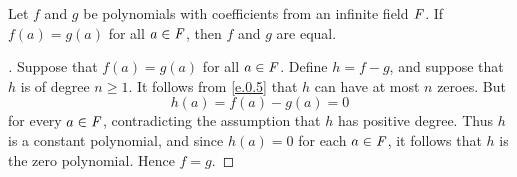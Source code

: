 \begin{thm}\label{e.10}
	Let \(f\) and \(g\) be polynomials with coefficients from an infinite field \(\mathit{F}\).
	If \(f(a) = g(a)\) for all \(a \in \mathit{F}\), then \(f\) and \(g\) are equal.
\end{thm}

\begin{proof}[]
	Suppose that \(f(a) = g(a)\) for all \(a \in \mathit{F}\).
	Define \(h = f - g\), and suppose that \(h\) is of degree \(n \geq 1\).
	It follows from \cref{e.0.5} that \(h\) can have at most \(n\) zeroes.
	But
	\[
		h(a) = f(a) - g(a) = 0
	\]
	for every \(a \in \mathit{F}\), contradicting the assumption that \(h\) has positive degree.
	Thus \(h\) is a constant polynomial, and since \(h(a) = 0\) for each \(a \in \mathit{F}\), it follows that \(h\) is the zero polynomial.
	Hence \(f = g\).
\end{proof}

